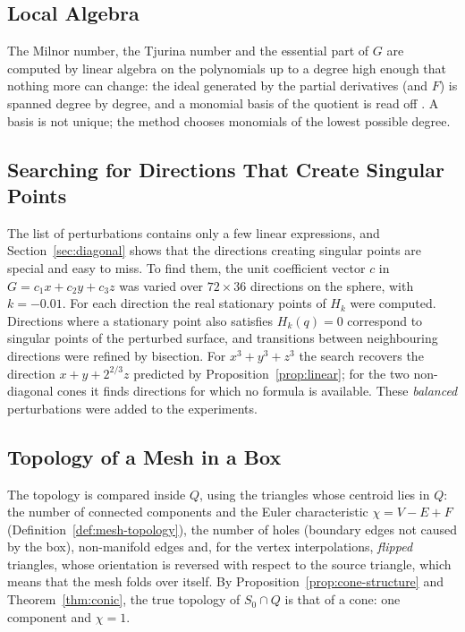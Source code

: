 \documentclass[12pt, a4paper, oneside]{book}
\theoremstyle{plain}
\theoremstyle{definition}
\theoremstyle{remark}
\theoremstyle{definition}
\begin{document}
\subsection{Local Algebra}

The Milnor number, the Tjurina number and the essential part of $G$ are computed by linear algebra on the polynomials up to a degree high enough that nothing more can change: the ideal generated by the partial derivatives (and $F$) is spanned degree by degree, and a monomial basis of the quotient is read off \cite{greuel2008singular}. A basis is not unique; the method chooses monomials of the lowest possible degree.

\subsection{Searching for Directions That Create Singular Points}
\label{sec:r-sweep}

The list of perturbations contains only a few linear expressions, and Section~\ref{sec:diagonal} shows that the directions creating singular points are special and easy to miss. To find them, the unit coefficient vector $c$ in $G=c_1x+c_2y+c_3z$ was varied over $72\times36$ directions on the sphere, with $k=-0.01$. For each direction the real stationary points of $H_k$ were computed. Directions where a stationary point also satisfies $H_k(q)=0$ correspond to singular points of the perturbed surface, and transitions between neighbouring directions were refined by bisection. For $x^3+y^3+z^3$ the search recovers the direction $x+y+2^{2/3}z$ predicted by Proposition~\ref{prop:linear}; for the two non-diagonal cones it finds directions for which no formula is available. These \emph{balanced} perturbations were added to the experiments.

\subsection{Topology of a Mesh in a Box}

The topology is compared inside $Q$, using the triangles whose centroid lies in $Q$: the number of connected components and the Euler characteristic $\chi=V-E+F$ (Definition~\ref{def:mesh-topology}), the number of holes (boundary edges not caused by the box), non-manifold edges and, for the vertex interpolations, \emph{flipped} triangles, whose orientation is reversed with respect to the source triangle, which means that the mesh folds over itself. By Proposition~\ref{prop:cone-structure} and Theorem~\ref{thm:conic}, the true topology of $S_0\cap Q$ is that of a cone: one component and $\chi=1$.
\end{document}
